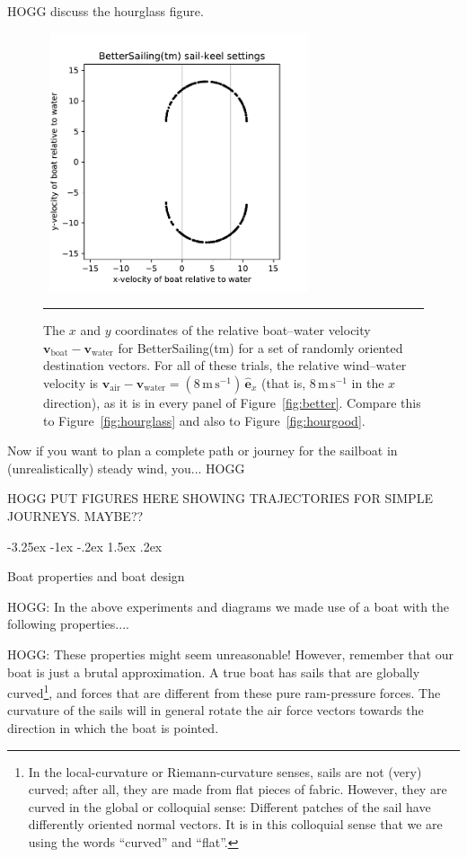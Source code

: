 \documentclass[letterpaper]{article}
\makeatletter
\renewcommand{\vec}[1]{\boldsymbol{#1}}
\newcommand{\uvec}{\vec{\hat{e}}}
\newcommand{\air}{\text{air}}
\newcommand{\water}{\text{water}}
\newcommand{\boat}{\text{boat}}
\newcommand{\vair}{\vec{v}_\air}
\newcommand{\vwater}{\vec{v}_\water}
\newcommand{\vboat}{\vec{v}_\boat}
\newcommand{\mps}{\mathrm{m\,s^{-1}}}
\newcommand{\figref}[1]{Figure~\ref{#1}}
\renewcommand\section{\@startsection {section}{1}{\z@}%
  {-3.25ex \@plus -1ex \@minus -.2ex}%
  {1.5ex \@plus .2ex}%
  {\raggedright\normalfont\large\bfseries}}
\newcommand{\figurerule}{\rule[1ex]{\textwidth}{0.2pt}}
\makeatother
\begin{document}
HOGG discuss the hourglass figure.
\begin{figure}[t!]
  ~\hfill\includegraphics[width=3in]{hourglass-better.pdf}\hfill~
  \caption{The $x$ and $y$ coordinates of the relative boat--water velocity $\vboat-\vwater$ for BetterSailing(tm) for a set of randomly oriented destination vectors.
  For all of these trials, the relative wind--water velocity is $\vair-\vwater=(8\,\mps)\,\uvec_x$ (that is, $8\,\mps$ in the $x$ direction), as it is in every panel of \figref{fig:better}.
  Compare this to \figref{fig:hourglass} and also to \figref{fig:hourgood}.\label{fig:hourbetter}}
  \figurerule
\end{figure}

Now if you want to plan a complete path or journey for the sailboat in (unrealistically) steady wind, you... HOGG

HOGG PUT FIGURES HERE SHOWING TRAJECTORIES FOR SIMPLE JOURNEYS. MAYBE??

\section{Boat properties and boat design}\label{sec:design}

HOGG: In the above experiments and diagrams we made use of a boat with the following properties....

HOGG: These properties might seem unreasonable! However, remember that our boat is just a brutal approximation.
A true boat has sails that are globally curved\footnote{%
In the local-curvature or Riemann-curvature senses, sails are not (very) curved; after all, they are made from flat pieces of fabric.
However, they are curved in the global or colloquial sense: Different patches of the sail have differently oriented normal vectors.
It is in this colloquial sense that we are using the words ``curved'' and ``flat''.},
and forces that are different from these pure ram-pressure forces.
The curvature of the sails will in general rotate the air force vectors towards the direction in which the boat is pointed.
\end{document}
